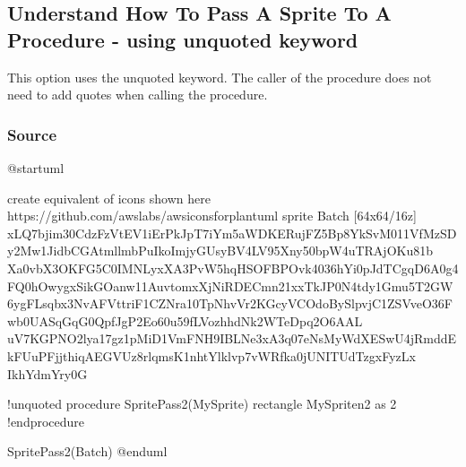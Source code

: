 \documentclass[letterpaper,10pt,english]{sphinxmanual}
\begin{document}
\subsection{Understand How To Pass A Sprite To A Procedure - using unquoted keyword}
\label{\detokenize{PassSpriteAsParameter/PassSpriteAsParameter:understand-how-to-pass-a-sprite-to-a-procedure-using-unquoted-keyword}}
This option uses the unquoted keyword. The caller of the procedure does not need
to add quotes when calling the procedure.

\begin{figure}[htbp]
\centering
\capstart

\caption{}\label{\detokenize{PassSpriteAsParameter/PassSpriteAsParameter:id6}}\end{figure}


\subsubsection{Source}
\label{\detokenize{PassSpriteAsParameter/PassSpriteAsParameter:id1}}
%
\begin{sphinxVerbatim}[commandchars=\\\{\},numbers=left,firstnumber=1,stepnumber=1]
@startuml

\PYGZsq{}create equivalent of icons shown here https://github.com/awslabs/aws\PYGZhy{}icons\PYGZhy{}for\PYGZhy{}plantuml
sprite \PYGZdl{}Batch [64x64/16z] \PYGZob{}
xLQ7bjim30CdzFzVtEV1iErPkJpT7iYm5aWDKERujFZ5Bp8YkSvM011VfMzSDy2Mw1JidbCGAtmllmbPuIkoImjyGUsyBV4LV95\PYGZus{}Xny50bpW4uTRAjOKu81b
Xa0vbX3OKFG5C0IMNLyxXA\PYGZus{}3PvW5hqHSOFBP\PYGZus{}Ovk4036hYi0pJdTCgqD6A0g4FQ0hOwygxSikGOanw11AuvtomxXjNiRDECmn21xxTkJP0N4tdy1Gmu5T2GW
6ygFL\PYGZus{}sqbx3NvA\PYGZus{}FVtt\PYGZus{}ri\PYGZus{}F1CZNra\PYGZhy{}10TpNhvVr2KGcyVCOdoBySlpv\PYGZhy{}jC1ZSVveO36\PYGZus{}Fwb0UASqGqG0QpfJgP2Eo60u59\PYGZhy{}fLVozhhdNk2WTeDpq2O6AAL\PYGZus{}
uV7KGPNO2lya17gz1pMiD1VmFNH9IBLNe3xA3q07eNsMy\PYGZus{}WdXESwU4jRmddEk\PYGZhy{}FUuPFjjthiqAEGVUz8rlqmsK1nhtYlklvp7vWRfka0jUNITUdTzgxFyzLx
\PYGZhy{}Ikh\PYGZus{}YdmYr\PYGZus{}y0G
\PYGZcb{}

!unquoted procedure \PYGZdl{}SpritePass2(\PYGZdl{}MySprite)
rectangle \PYGZdq{}\PYGZlt{}\PYGZdl{}MySprite\PYGZgt{}\PYGZbs{}n2\PYGZdq{} as 2
!endprocedure

\PYGZdl{}SpritePass2(\PYGZdl{}Batch)
@enduml
\end{sphinxVerbatim}
\sphinxresetverbatimhllines
\end{document}
